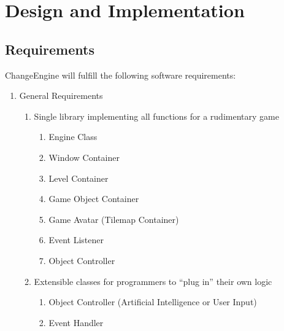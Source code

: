 \documentclass[12pt]{article}
\begin{document}
  \section{Design and Implementation}

\subsection{Requirements}

ChangeEngine will fulfill the following software requirements:

\begin{enumerate}
  \item General Requirements

  \begin{enumerate}
    \item Single library implementing all functions for a rudimentary game

    \begin{enumerate}
      \item Engine Class
      \item Window Container
      \item Level Container
      \item Game Object Container
      \item Game Avatar (Tilemap Container)
      \item Event Listener
      \item Object Controller
    \end{enumerate}

    \item Extensible classes for programmers to ``plug in'' their own logic

    \begin{enumerate}
      \item Object Controller (Artificial Intelligence or User Input)
      \item Event Handler
    \end{enumerate}

  \end{enumerate}

\end{enumerate}
\end{document}
